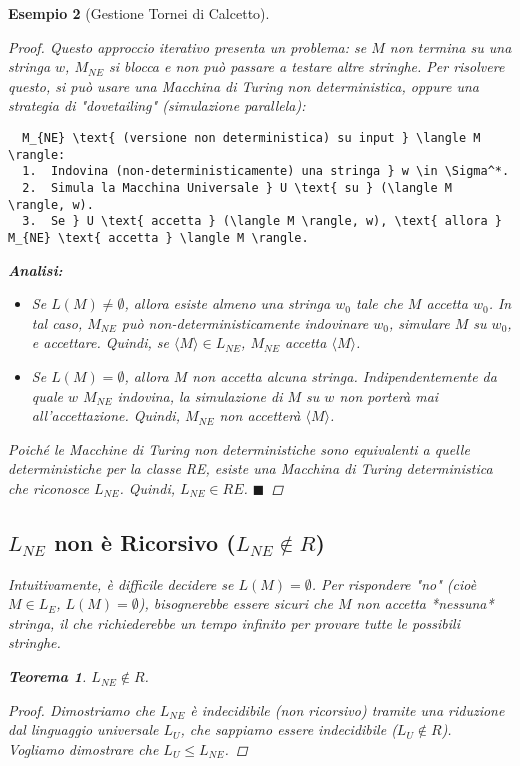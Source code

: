 \documentclass[a4paper]{article}
\newtheorem{theorem}{Teorema}[section] %
\newtheorem{example}[theorem]{Esempio}
\begin{document}
\begin{example}[Gestione Tornei di Calcetto]
\begin{proof}
Questo approccio iterativo presenta un problema: se $M$ non termina su una stringa $w$, $M_{NE}$ si blocca e non può passare a testare altre stringhe.
Per risolvere questo, si può usare una Macchina di Turing non deterministica, oppure una strategia di "dovetailing" (simulazione parallela):

\begin{verbatim}
  M_{NE} \text{ (versione non deterministica) su input } \langle M \rangle:
  1.  Indovina (non-deterministicamente) una stringa } w \in \Sigma^*.
  2.  Simula la Macchina Universale } U \text{ su } (\langle M \rangle, w).
  3.  Se } U \text{ accetta } (\langle M \rangle, w), \text{ allora } M_{NE} \text{ accetta } \langle M \rangle.
\end{verbatim}

\textbf{Analisi:}
\begin{itemize}
    \item Se $L(M) \neq \emptyset$, allora esiste almeno una stringa $w_0$ tale che $M$ accetta $w_0$. In tal caso, $M_{NE}$ può non-deterministicamente indovinare $w_0$, simulare $M$ su $w_0$, e accettare. Quindi, se $\langle M \rangle \in L_{NE}$, $M_{NE}$ accetta $\langle M \rangle$.
    \item Se $L(M) = \emptyset$, allora $M$ non accetta alcuna stringa. Indipendentemente da quale $w$ $M_{NE}$ indovina, la simulazione di $M$ su $w$ non porterà mai all'accettazione. Quindi, $M_{NE}$ non accetterà $\langle M \rangle$.
\end{itemize}
Poiché le Macchine di Turing non deterministiche sono equivalenti a quelle deterministiche per la classe RE, esiste una Macchina di Turing deterministica che riconosce $L_{NE}$. Quindi, $L_{NE} \in RE$.
$\blacksquare$
\end{proof}

\subsection{$L_{NE}$ non è Ricorsivo ($L_{NE} \notin R$)}

Intuitivamente, è difficile decidere se $L(M) = \emptyset$. Per rispondere "no" (cioè $M \in L_E$, $L(M) = \emptyset$), bisognerebbe essere sicuri che $M$ non accetta *nessuna* stringa, il che richiederebbe un tempo infinito per provare tutte le possibili stringhe.

\begin{theorem}
$L_{NE} \notin R$.
\end{theorem}
\begin{proof}
Dimostriamo che $L_{NE}$ è indecidibile (non ricorsivo) tramite una riduzione dal linguaggio universale $L_U$, che sappiamo essere indecidibile ($L_U \notin R$).
Vogliamo dimostrare che $L_U \le L_{NE}$.


\end{proof}
\end{example}
\end{document}
